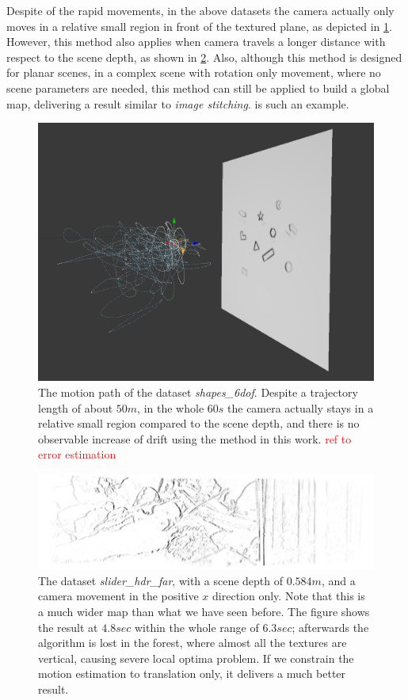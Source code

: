 Despite of the rapid movements, in the above datasets the camera
actually only moves in a relative small region in front of the
textured plane, as depicted in \cref{fig:shapes_6dof_path}. However,
this method also applies when camera travels a longer distance with
respect to the scene depth, as shown in
\cref{fig:slider_hdr_far_map}. Also, although this method is designed
for planar scenes, in a complex scene with rotation only movement,
where no scene parameters are needed, this method can still be applied
to build a global map, delivering a result similar to \textit{image
  stitching}.  is such an example.
\begin{figure}
  \centering
  \includegraphics[width=\textwidth]{images/shapes_6dof_path.png}
  \caption{The motion path of the dataset
    \textit{shapes\_6dof}. Despite a trajectory length of about $50m$,
    in the whole $60s$ the camera actually stays in a relative small
    region compared to the scene depth, and there is no observable
    increase of drift using the method in this
    work. \textcolor{red}{ref to error estimation}}
  \label{fig:shapes_6dof_path}
\end{figure}
\begin{figure}
  \centering
  \includegraphics[width=\textwidth]{images/slider_hdr_far_map_36.jpg}
  \caption{The dataset \textit{slider\_hdr\_far}, with a scene depth
    of $0.584 m$, and a camera movement in the positive $x$ direction
    only. Note that this is a much wider map than what we have seen
    before. The figure shows the result at $4.8 sec$ within the whole
    range of $6.3 sec$; afterwards the algorithm is lost in the
    forest, where almost all the textures are vertical, causing severe
    local optima problem. If we constrain the motion estimation to
    translation only, it delivers a much better result.}

  \label{fig:slider_hdr_far_map}
\end{figure}

